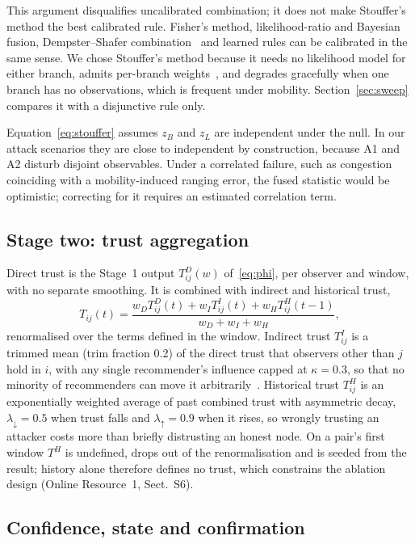\documentclass[pdflatex,sn-mathphys-num]{sn-jnl}%
\theoremstyle{thmstyleone}%
\theoremstyle{thmstyletwo}%
\theoremstyle{thmstylethree}%
\begin{document}
This argument disqualifies uncalibrated combination; it does not make
Stouffer's method the best calibrated rule. Fisher's method, likelihood-ratio
and Bayesian fusion, Dempster--Shafer combination~\cite{singh2020self} and
learned rules can be calibrated in the same sense. We chose Stouffer's method
because it needs no likelihood model for either branch, admits per-branch
weights~\cite{whitlock2005weighted}, and degrades gracefully when one branch
has no observations, which is frequent under mobility. Section~\ref{sec:sweep}
compares it with a disjunctive rule only.

Equation~\eqref{eq:stouffer} assumes $z_B$ and $z_L$ are independent under the
null. In our attack scenarios they are close to independent by construction,
because A1 and A2 disturb disjoint observables. Under a correlated failure,
such as congestion coinciding with a mobility-induced ranging error, the fused
statistic would be optimistic; correcting for it requires an estimated
correlation term.

\subsection{Stage two: trust aggregation}

Direct trust is the Stage~1 output $T^D_{ij}(w)$ of~\eqref{eq:phi}, per
observer and window, with no separate smoothing. It is combined with indirect
and historical trust,
\begin{equation}
\label{eq:combined}
T_{ij}(t) = \frac{w_D T^D_{ij}(t) + w_I T^I_{ij}(t) + w_H T^H_{ij}(t-1)}{w_D + w_I + w_H},
\end{equation}
renormalised over the terms defined in the window. Indirect trust $T^I_{ij}$ is
a trimmed mean (trim fraction 0.2) of the direct trust that observers other
than $j$ hold in $i$, with any single recommender's influence capped at
$\kappa = 0.3$, so that no minority of recommenders can move it
arbitrarily~\cite{liu2008attack}. Historical trust $T^H_{ij}$ is an
exponentially weighted average of past combined trust with asymmetric decay,
$\lambda_\downarrow = 0.5$ when trust falls and $\lambda_\uparrow = 0.9$ when
it rises, so wrongly trusting an attacker costs more than briefly distrusting
an honest node. On a pair's first window $T^H$ is undefined, drops out of the
renormalisation and is seeded from the result; history alone therefore
defines no trust, which constrains the ablation design (Online Resource~1,
Sect.~S6).

\subsection{Confidence, state and confirmation}
\end{document}
